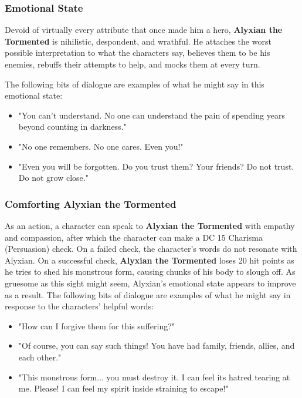 \documentclass[10pt,a4paper,twoside,bg=print,twocolumn,openany,nodeprecatedcode]{dndbook}
\begin{document}
\subsubsection{Emotional State}
Devoid of virtually every attribute that once made him a hero, \textbf{Alyxian the Tormented} is nihilistic, despondent, and wrathful. He attaches the worst possible interpretation to what the characters say, believes them to be his enemies, rebuffs their attempts to help, and mocks them at every turn.

The following bits of dialogue are examples of what he might say in this emotional state:


\begin{itemize}
\item "You can't understand. No one can understand the pain of spending years beyond counting in darkness."
\item "No one remembers. No one cares. Even you!"
\item "Even you will be forgotten. Do you trust them? Your friends? Do not trust. Do not grow close."
\end{itemize}

\subsubsection{Comforting Alyxian the Tormented}
As an action, a character can speak to \textbf{Alyxian the Tormented} with empathy and compassion, after which the character can make a DC 15 Charisma (Persuasion) check. On a failed check, the character's words do not resonate with Alyxian. On a successful check, \textbf{Alyxian the Tormented} loses 20 hit points as he tries to shed his monstrous form, causing chunks of his body to slough off. As gruesome as this sight might seem, Alyxian's emotional state appears to improve as a result. The following bits of dialogue are examples of what he might say in response to the characters' helpful words:


\begin{itemize}
\item "How can I forgive them for this suffering?"
\item "Of course, you can say such things! You have had family, friends, allies, and each other."
\item "This monstrous form... you must destroy it. I can feel its hatred tearing at me. Please! I can feel my spirit inside straining to escape!"
\end{itemize}
\end{document}
